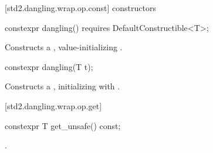 [std2.dangling.wrap.op.const]{ constructors}

%
\begin{itemdecl}
constexpr dangling() requires DefaultConstructible<T>;
\end{itemdecl}

\begin{itemdescr}
\pnum
\effects Constructs a , value-initializing .
\end{itemdescr}

%
\begin{itemdecl}
constexpr dangling(T t);
\end{itemdecl}

\begin{itemdescr}
\pnum
\effects Constructs a , initializing  with .
\end{itemdescr}

[std2.dangling.wrap.op.get]{}

%
%
\begin{itemdecl}
constexpr T get_unsafe() const;
\end{itemdecl}

\begin{itemdescr}
\pnum
\returns {}.
\end{itemdescr}

